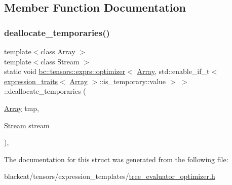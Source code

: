 \subsection{Member Function Documentation}
\mbox{\label{structbc_1_1tensors_1_1exprs_1_1optimizer_3_01Array_00_01std_1_1enable__if__t_3_01expression__tr6f024f979d44d7dd29d94a5b5f9e889b_abcf673bed3079a33921f08a1eb084070}} 
\subsubsection{\texorpdfstring{deallocate\+\_\+temporaries()}{deallocate\_temporaries()}}
{\footnotesize\ttfamily template$<$class Array $>$ \\
template$<$class Stream $>$ \\
static void \hyperlink{structbc_1_1tensors_1_1exprs_1_1optimizer}{bc\+::tensors\+::exprs\+::optimizer}$<$ \hyperlink{structbc_1_1tensors_1_1exprs_1_1Array}{Array}, std\+::enable\+\_\+if\+\_\+t$<$ \hyperlink{structbc_1_1tensors_1_1exprs_1_1expression__traits}{expression\+\_\+traits}$<$ \hyperlink{structbc_1_1tensors_1_1exprs_1_1Array}{Array} $>$\+::is\+\_\+temporary\+::value $>$ $>$\+::deallocate\+\_\+temporaries (\begin{DoxyParamCaption}\item[{\hyperlink{structbc_1_1tensors_1_1exprs_1_1Array}{Array}}]{tmp,  }\item[{\hyperlink{classbc_1_1streams_1_1Stream}{Stream}}]{stream }\end{DoxyParamCaption})\hspace{0.3cm}{\ttfamily [inline]}, {\ttfamily [static]}}



The documentation for this struct was generated from the following file\+:\begin{DoxyCompactItemize}
\item 
blackcat/tensors/expression\+\_\+templates/\hyperlink{tree__evaluator__optimizer_8h}{tree\+\_\+evaluator\+\_\+optimizer.\+h}\end{DoxyCompactItemize}
